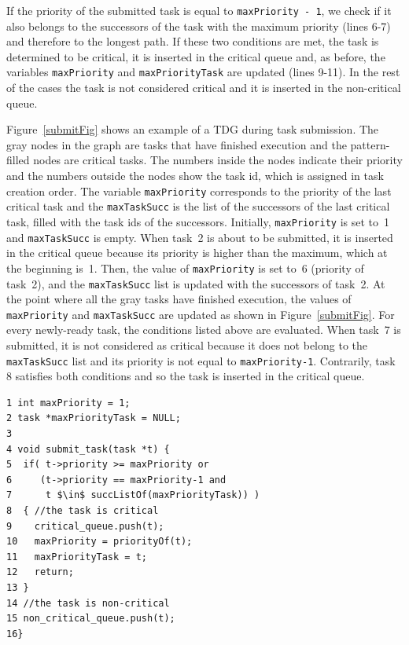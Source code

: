 If the priority of the submitted task is equal to \texttt{maxPriority - 1}, we check if it also belongs to the successors of the task with the maximum priority (lines 6-7) and therefore to the longest path. If these two conditions are met, the task is determined to be critical, it is inserted in the critical queue and, as before, the variables \texttt{maxPriority} and \texttt{maxPriorityTask} are updated (lines 9-11). In the rest of the cases the task is not considered critical and it is inserted in the non-critical queue.

Figure~\ref{submitFig} shows an example of a TDG during task submission. The gray nodes in the graph are tasks that have finished execution and the pattern-filled nodes are critical tasks. The numbers inside the nodes indicate their priority and the numbers outside the nodes show the task id, which is assigned in task creation order. The variable \texttt{maxPriority} corresponds to the priority of the last critical task and the \texttt{maxTaskSucc} is the list of the successors of the last critical task, filled with the task ids of the successors. Initially, \texttt{maxPriority} is set to~1 and \texttt{maxTaskSucc} is empty. When task~2 is about to be submitted, it is inserted in the critical queue because its priority is higher than the maximum, which at the beginning is~1. Then, the value of \texttt{maxPriority} is set to~6 (priority of task~2), and the \texttt{maxTaskSucc} list is updated with the successors of task~2. At the point where all the gray tasks have finished execution, the values of \texttt{maxPriority} and \texttt{maxTaskSucc} are updated as shown  in Figure~\ref{submitFig}. For every newly-ready task, the conditions listed above are evaluated. When task~7 is submitted, it is not considered as critical because it does not belong to the \texttt{maxTaskSucc} list and its priority is not equal to \texttt{maxPriority-1}. Contrarily, task 8 satisfies both conditions and so the task is inserted in the critical queue.

\begin{lstlisting}[float, emph={void,if,return,non_critical_queue, critical_queue,submit_task}, captionpos=b, caption={Pseudo-code for task submission with CATS.},label=submission, emph={[2]mat}, emphstyle={[2]}, aboveskip={0\baselineskip}, frame=tb, belowskip={-0.4cm}]
1 int maxPriority = 1;
2 task *maxPriorityTask = NULL;
3
4 void submit_task(task *t) {
5  if( t->priority >= maxPriority or
6     (t->priority == maxPriority-1 and
7      t $\in$ succListOf(maxPriorityTask)) )
8  { //the task is critical
9    critical_queue.push(t);
10   maxPriority = priorityOf(t);
11   maxPriorityTask = t;
12   return;
13 }
14 //the task is non-critical
15 non_critical_queue.push(t);     
16}
\end{lstlisting}

